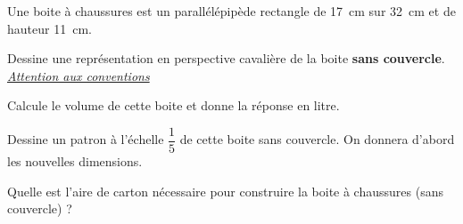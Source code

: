 Une boite à chaussures est un parallélépipède rectangle de 17~cm
 sur 32~cm et de hauteur 11~cm.
\begin{myenumerate}
\item Dessine une représentation en perspective cavalière de la boite
{\bf sans couvercle}.\\\underline{\em Attention aux conventions}
\item Calcule le volume de cette boite et donne la réponse en litre.
\item Dessine un patron à l'échelle $\dfrac15$ de cette boite sans
 couvercle. On donnera d'abord les nouvelles dimensions.
\item Quelle est l'aire de carton nécessaire pour construire la boite
 à chaussures (sans couvercle) ?
\end{myenumerate}
